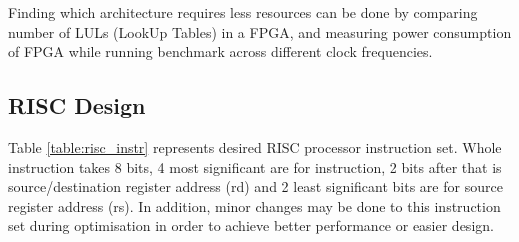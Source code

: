 \documentclass[a4paper,11pt]{article}
\begin{document}
Finding which architecture requires less resources can be done by comparing number of LULs (LookUp Tables) in a FPGA, and measuring power consumption of FPGA while running benchmark across different clock frequencies.

\subsection{RISC Design}
Table \ref{table:risc_instr} represents desired RISC processor instruction set. Whole instruction takes 8 bits, 4 most significant are for instruction, 2 bits after that is source/destination register address (rd) and 2 least significant bits are for source register address (rs). In addition, minor changes may be done to this instruction set during optimisation in order to achieve better performance or easier design.
\end{document}
